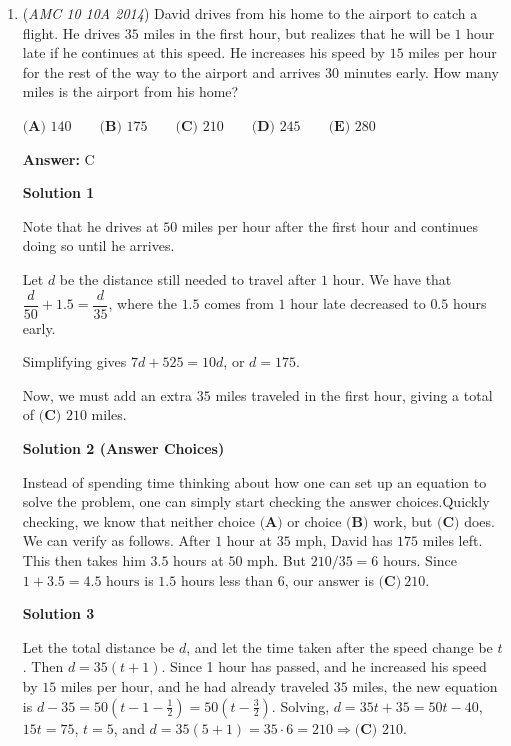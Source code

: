 \begin{enumerate}
 


	\item (\textit{AMC 10 10A 2014}) David drives from his home to the airport to catch a flight.  He drives $35$ miles in the first hour, but realizes that he will be $1$ hour late if he continues at this speed.  He increases his speed by $15$ miles per hour for the rest of the way to the airport and arrives $30$ minutes early.  How many miles is the airport from his home?


 $\textbf{(A) }140\qquad \textbf{(B) }175\qquad \textbf{(C) }210\qquad \textbf{(D) }245\qquad \textbf{(E) }280\qquad$

 \textbf{Answer: }C



\textbf{Solution 1}

Note that he drives at $50$ miles per hour after the first hour and continues doing so until he arrives.

 Let $d$ be the distance still needed to travel after $1$ hour. We have that $\dfrac{d}{50}+1.5=\dfrac{d}{35}$, where the $1.5$ comes from $1$ hour late decreased to $0.5$ hours early.

 Simplifying gives $7d+525=10d$, or $d=175$.

 Now, we must add an extra $35$ miles traveled in the first hour, giving a total of $\boxed{\textbf{(C) } 210}$ miles.

 



\textbf{Solution 2 (Answer Choices)}

Instead of spending time thinking about how one can set up an equation to solve the problem, one can simply start checking the answer choices.Quickly checking, we know that neither choice $\textbf{(A)}$ or choice $\textbf{(B)}$ work, but $\textbf{(C)}$ does. We can verify as follows. After $1$ hour at $35 \text{ mph}$, David has $175$ miles left. This then takes him $3.5$ hours at $50 \text{ mph}$. But $210/35 = 6 \text{ hours}$. Since $1+3.5 = 4.5 \text{ hours}$ is $1.5$ hours less than $6$, our answer is $\boxed{\textbf{(C)} \: 210}$.

 



\textbf{Solution 3}

Let the total distance be $d$, and let the time taken after the speed change be $t$. Then $d=35(t+1)$. Since 1 hour has passed, and he increased his speed by $15$ miles per hour, and he had already traveled $35$ miles, the new equation is $d-35=50(t-1-\frac{1}{2})=50(t-\frac{3}{2})$. Solving, $d=35t+35=50t-40$, $15t=75$, $t=5$, and $d=35(5+1)=35\cdot 6=210 \Longrightarrow \boxed{\textbf{(C) } 210}$.


\end{enumerate}

